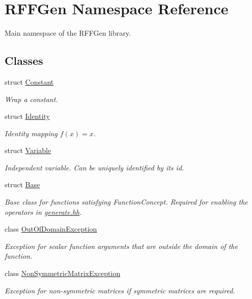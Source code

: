 \hypertarget{namespaceRFFGen}{\section{R\-F\-F\-Gen Namespace Reference}
\label{namespaceRFFGen}
}


Main namespace of the R\-F\-F\-Gen library.  


\subsection*{Classes}
\begin{DoxyCompactItemize}
\item 
struct \hyperlink{structRFFGen_1_1Constant}{Constant}
\begin{DoxyCompactList}\small\item\em Wrap a constant. \end{DoxyCompactList}\item 
struct \hyperlink{structRFFGen_1_1Identity}{Identity}
\begin{DoxyCompactList}\small\item\em Identity mapping $ f(x)=x $. \end{DoxyCompactList}\item 
struct \hyperlink{structRFFGen_1_1Variable}{Variable}
\begin{DoxyCompactList}\small\item\em Independent variable. Can be uniquely identified by its id. \end{DoxyCompactList}\item 
struct \hyperlink{structRFFGen_1_1Base}{Base}
\begin{DoxyCompactList}\small\item\em Base class for functions satisfying Function\-Concept. Required for enabling the operators in \hyperlink{generate_8hh_source}{generate.\-hh}. \end{DoxyCompactList}\item 
class \hyperlink{classRFFGen_1_1OutOfDomainException}{Out\-Of\-Domain\-Exception}
\begin{DoxyCompactList}\small\item\em Exception for scalar function arguments that are outside the domain of the function. \end{DoxyCompactList}\item 
class \hyperlink{classRFFGen_1_1NonSymmetricMatrixException}{Non\-Symmetric\-Matrix\-Exception}
\begin{DoxyCompactList}\small\item\em Exception for non-\/symmetric matrices if symmetric matrices are required. \end{DoxyCompactList}\item 

\end{DoxyCompactItemize}
